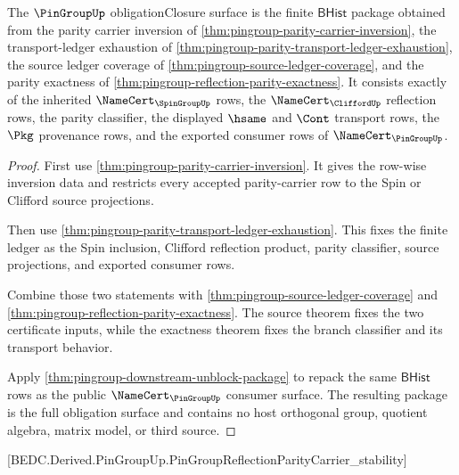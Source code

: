 \begin{theorem}
\label{thm:pingroup-parity-namecert-obligation-surface}
The $\PinGroupUp$ obligationClosure surface is the finite
$\mathsf{BHist}$ package obtained from the parity carrier inversion of
\autoref{thm:pingroup-parity-carrier-inversion}, the transport-ledger
exhaustion of \autoref{thm:pingroup-parity-transport-ledger-exhaustion}, the
source ledger coverage of \autoref{thm:pingroup-source-ledger-coverage}, and
the parity exactness of \autoref{thm:pingroup-reflection-parity-exactness}.
It consists exactly of the inherited $\NameCert_{\SpinGroupUp}$ rows, the
$\NameCert_{\CliffordUp}$ reflection rows, the parity classifier, the displayed
$\hsame$ and $\Cont$ transport rows, the $\Pkg$ provenance rows, and the
exported consumer rows of $\NameCert_{\PinGroupUp}$.
\end{theorem}
\begin{proof}
First use \autoref{thm:pingroup-parity-carrier-inversion}. It gives the
row-wise inversion data and restricts every accepted parity-carrier row to the
Spin or Clifford source projections.

Then use \autoref{thm:pingroup-parity-transport-ledger-exhaustion}. This fixes
the finite ledger as the Spin inclusion, Clifford reflection product, parity
classifier, source projections, and exported consumer rows.

Combine those two statements with
\autoref{thm:pingroup-source-ledger-coverage} and
\autoref{thm:pingroup-reflection-parity-exactness}. The source theorem fixes
the two certificate inputs, while the exactness theorem fixes the branch
classifier and its transport behavior.

Apply \autoref{thm:pingroup-downstream-unblock-package} to repack the same
$\mathsf{BHist}$ rows as the public $\NameCert_{\PinGroupUp}$ consumer surface.
The resulting package is the full obligation surface and contains no host
orthogonal group, quotient algebra, matrix model, or third source.
\end{proof}

[BEDC.Derived.PinGroupUp.PinGroupReflectionParityCarrier\_stability]
